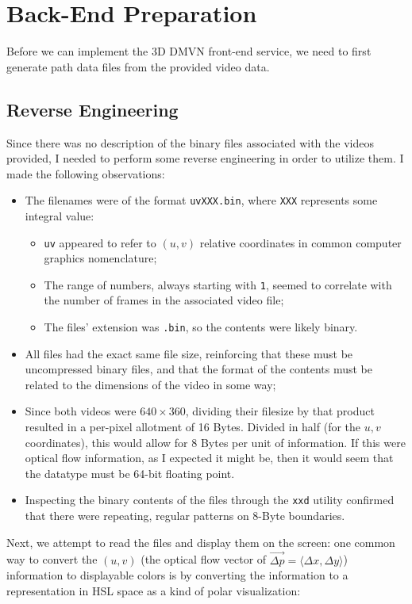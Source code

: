 \section{Back-End Preparation}
Before we can implement the 3D DMVN front-end service, we need to first generate path data files from the provided video data.

\subsection{Reverse Engineering}
Since there was no description of the binary files associated with the videos provided, I needed to perform some reverse engineering in order to utilize them. I made the following observations:
\begin{itemize}
    \item The filenames were of the format \texttt{uvXXX.bin}, where \texttt{XXX} represents some integral value:
    \begin{itemize}
        \item \texttt{uv} appeared to refer to $(u,v)$ relative coordinates in common computer graphics nomenclature;
        \item The range of numbers, always starting with \texttt{1}, seemed to correlate with the number of frames in the associated video file;
        \item The files' extension was \texttt{.bin}, so the contents were likely binary.
    \end{itemize}
    \item All files had the exact same file size, reinforcing that these must be uncompressed binary files, and that the format of the contents must be related to the dimensions of the video in some way;
    \item Since both videos were $640\times 360$, dividing their filesize by that product resulted in a per-pixel allotment of 16 Bytes. Divided in half (for the ${u,v}$ coordinates), this would allow for 8 Bytes per unit of information. If this were optical flow information, as I expected it might be, then it would seem that the datatype must be 64-bit floating point.
    \item Inspecting the binary contents of the files through the \texttt{xxd} utility confirmed that there were repeating, regular patterns on 8-Byte boundaries.
\end{itemize}\par
Next, we attempt to read the files and display them on the screen: one common way to convert the $(u,v)$ (the optical flow vector of $\vec{\Delta p}=\langle \Delta x,\Delta y \rangle$) information to displayable colors is by converting the information to a representation in HSL space as a kind of polar visualization:
